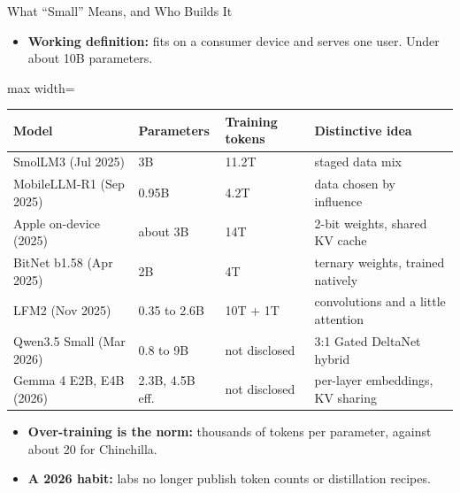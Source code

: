 \begin{frame}{What ``Small'' Means, and Who Builds It}
    \begin{itemize}\itemsep0.3em
        \item \textbf{Working definition:} fits on a consumer device and serves one user. Under about 10B parameters.
    \end{itemize}
    \begin{center}
    \footnotesize
    \renewcommand{\arraystretch}{1.08}
    \setlength{\tabcolsep}{4pt}\begin{adjustbox}{max width=\linewidth}\begin{tabular}{llll}
        \toprule
        \textbf{Model} & \textbf{Parameters} & \textbf{Training tokens} & \textbf{Distinctive idea} \\
        \midrule
        SmolLM3 (Jul 2025) & 3B & 11.2T & staged data mix \\
        MobileLLM-R1 (Sep 2025) & 0.95B & 4.2T & data chosen by influence \\
        Apple on-device (2025) & about 3B & 14T & 2-bit weights, shared KV cache \\
        BitNet b1.58 (Apr 2025) & 2B & 4T & ternary weights, trained natively \\
        LFM2 (Nov 2025) & 0.35 to 2.6B & 10T + 1T & convolutions and a little attention \\
        Qwen3.5 Small (Mar 2026) & 0.8 to 9B & not disclosed & 3:1 Gated DeltaNet hybrid \\
        \rowcolor{KAUSTcyan!12} Gemma 4 E2B, E4B (2026) & 2.3B, 4.5B eff. & not disclosed & per-layer embeddings, KV sharing \\
        \bottomrule
    \end{tabular}\end{adjustbox}
    \end{center}
    \begin{itemize}\itemsep0.3em
        \item \textbf{Over-training is the norm:} thousands of tokens per parameter, against about 20 for Chinchilla.
        \item \textbf{A 2026 habit:} labs no longer publish token counts or distillation recipes.
    \end{itemize}
\end{frame}

